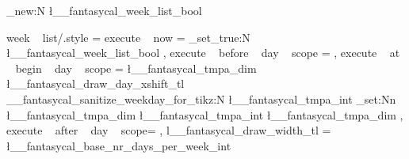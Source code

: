 













\bool_new:N \l__fantasycal_week_list_bool

\tikzset
  {
    week ~ list/.style = 
      {
        execute  ~ now = { \bool_set_true:N \l__fantasycal_week_list_bool } ,
        execute ~ before ~ day ~ scope =
          {
              {
                  { 
                    \pgftransformyshift{-\pgf@y}
                  } 
              }
          }
        ,
        execute ~ at ~ begin ~ day ~ scope =
          {
            \pgfmathsetlength \l__fantasycal_tmpa_dim { \l__fantasycal_draw_day_xshift_tl}
            \__fantasycal_sanitize_weekday_for_tikz:N \l__fantasycal_tmpa_int
            \dim_set:Nn \l__fantasycal_tmpa_dim 
              { \l__fantasycal_tmpa_int \l__fantasycal_tmpa_dim }
          }
        ,
        execute ~ after ~ day ~ scope=
          {
              {
              }
          }
        ,
        l__fantasycal_draw_width_tl = \l__fantasycal_base_nr_days_per_week_int
      }    
  }
    
